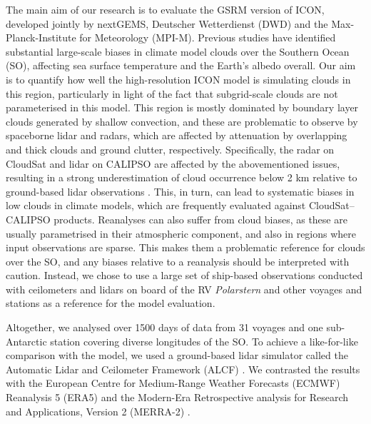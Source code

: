 \documentclass[12pt,a4paper]{article}
\begin{document}
The main aim of our research is to evaluate the GSRM version of ICON, developed
jointly by nextGEMS, Deutscher Wetterdienst (DWD) and the Max-Planck-Institute
for Meteorology (MPI-M). Previous studies have identified substantial
large-scale biases in climate model clouds over the Southern Ocean (SO),
affecting sea surface temperature and the Earth’s albedo overall. Our aim is to
quantify how well the high-resolution ICON model is simulating clouds in this
region, particularly in light of the fact that subgrid-scale clouds are not
parameterised in this model. This region is mostly dominated by boundary layer
clouds generated by shallow convection, and these are problematic to observe by
spaceborne lidar and radars, which are affected by attenuation by overlapping
and thick clouds and ground clutter, respectively.  Specifically, the radar on
CloudSat and lidar on CALIPSO are affected by the abovementioned issues,
resulting in a strong underestimation of cloud occurrence below 2 km relative to
ground-based lidar observations \citep{mcerlich2021}.  This, in turn, can lead to
systematic biases in low clouds in climate models, which are frequently
evaluated against CloudSat--CALIPSO products. Reanalyses can also suffer from
cloud biases, as these are usually parametrised in their atmospheric component,
and also in regions where input observations are sparse.  This makes them a
problematic reference for clouds over the SO, and any biases relative to a
reanalysis should be interpreted with caution. Instead, we chose to use a large
set of ship-based observations conducted with ceilometers and lidars on board
of the RV \emph{Polarstern} and other voyages and stations as a reference for
the model evaluation.

Altogether, we analysed over 1500 days of data from 31 voyages and one
sub-Antarctic station covering diverse longitudes of the SO. To
achieve a like-for-like comparison with the model, we used a ground-based lidar
simulator called the Automatic Lidar and Ceilometer Framework (ALCF)
\citep{kuma2021}. We contrasted the results with the European Centre for
Medium-Range Weather Forecasts (ECMWF) Reanalysis 5 (ERA5) \citep{era5} and the
Modern-Era Retrospective analysis for Research and Applications, Version 2
(MERRA-2) \citep{gelaro2017}.
\end{document}
